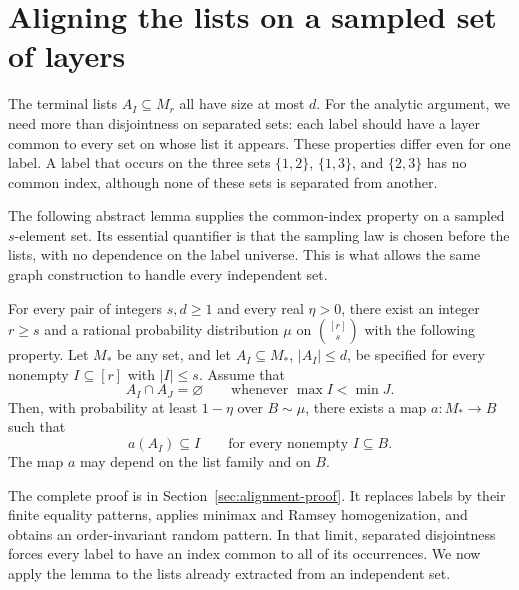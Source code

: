 \section{Aligning the lists on a sampled set of layers}
\label{sec:alignment}

The terminal lists $A_I\subseteq M_r$ all have size at most $d$.
For the analytic argument, we need more than disjointness on separated
sets: each label should have a layer common to every set on whose list
it appears. These properties differ even for one label. A label that
occurs on the three sets $\{1,2\}$, $\{1,3\}$, and $\{2,3\}$ has no
common index, although none of these sets is separated from another.

The following abstract lemma supplies the common-index property on a
sampled $s$-element set. Its essential quantifier is that the sampling
law is chosen before the lists, with no dependence on the label universe.
This is what allows the same graph construction to handle every
independent set.

\begin{samepage}
\begin{lemma}
For every pair of integers $s,d\geq 1$ and every real $\eta>0$, there exist
an integer $r\geq s$ and a rational probability distribution $\mu$ on
$\binom{[r]}s$ with the following property.\label{lem:alignment}
Let $M_*$ be any set, and let
$A_I\subseteq M_*$, $|A_I|\leq d$, be specified for every nonempty
$I\subseteq[r]$ with $|I|\leq s$. Assume that
\begin{equation}\label{align:separation}
 A_I\cap A_J=\varnothing
 \qquad\text{whenever }\max I<\min J.
\end{equation}
Then, with probability at least $1-\eta$ over $B\sim\mu$, there exists a map
$a:M_*\to B$ such that
\begin{equation}\label{align:conclusion}
 a(A_I)\subseteq I
 \qquad\text{for every nonempty }I\subseteq B.
\end{equation}
The map $a$ may depend on the list family and on $B$.
\end{lemma}
\end{samepage}

The complete proof is in Section~\ref{sec:alignment-proof}.
It replaces labels by their finite equality patterns, applies minimax
and Ramsey homogenization, and obtains an order-invariant random
pattern. In that limit, separated disjointness forces every label to
have an index common to all of its occurrences. We now apply the
lemma to the lists already extracted from an independent set.

